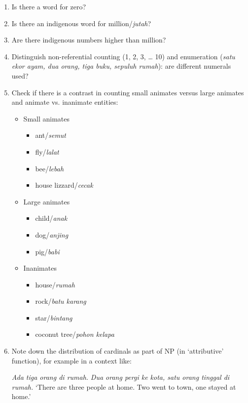 \begin{enumerate}
\item Is there a word for zero?
\item Is there an indigenous word for million/\textit{jutah}? 
\item Are there indigenous numbers higher than million?
\item Distinguish non-referential counting (1, 2, 3, {\dots} 10) and enumeration (\textit{satu ekor ayam, dua orang, tiga buku, sepuluh rumah}): are different numerals used?
\item Check if there is a contrast in counting small animates versus large animates and animate vs. inanimate entities: 
  \begin{itemize}
  \item Small animates 
    \begin{itemize}
    \item ant/\textit{semut}  
    \item fly/\textit{lalat} 
    \item bee/\textit{lebah} 
    \item house lizzard/\textit{cecak}   
    \end{itemize}
  \item Large animates  
    \begin{itemize}
    \item child/\textit{anak}  
    \item dog/\textit{anjing} 
    \item pig/\textit{babi}  
    \end{itemize}
  \item Inanimates 
    \begin{itemize}
    \item house/\textit{rumah}  
    \item rock/\textit{batu karang}  
    \item star/\textit{bintang}  
    \item coconut tree/\textit{pohon kelapa} 
    \end{itemize} 
  \end{itemize}
\item Note down the distribution of cardinals as part of NP (in `attributive' function), for example in a context like:

\textit{Ada tiga orang di rumah.} \textit{Dua orang pergi ke kota, satu orang tinggal di rumah.} 
`There are three people at home. Two went to town, one stayed at home.' 



\end{enumerate}
